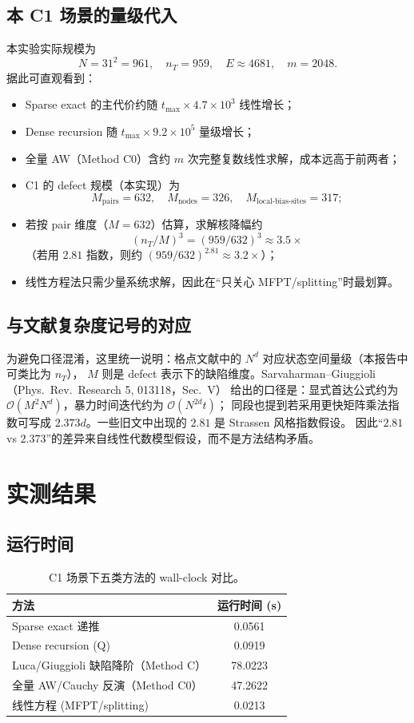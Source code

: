 \documentclass[11pt,a4paper]{ctexart}
\begin{document}
\subsection{本 C1 场景的量级代入}
本实验实际规模为
\[
N=31^2=961,\quad n_T=959,\quad E\approx 4681,\quad m=2048.
\]
据此可直观看到：
\begin{itemize}[leftmargin=2em]
  \item Sparse exact 的主代价约随 $t_{\max}\times 4.7\times 10^3$ 线性增长；
  \item Dense recursion 随 $t_{\max}\times 9.2\times 10^5$ 量级增长；
  \item 全量 AW（Method C0）含约 $m$ 次完整复数线性求解，成本远高于前两者；
  \item C1 的 defect 规模（本实现）为
  \[
  M_{\text{pairs}}=632,\quad M_{\text{nodes}}=326,\quad M_{\text{local-bias-sites}}=317;
  \]
  \item 若按 pair 维度（$M=632$）估算，求解核降幅约
  \[
  (n_T/M)^3=(959/632)^3\approx 3.5\times
  \]
  （若用 $2.81$ 指数，则约 $(959/632)^{2.81}\approx 3.2\times$）；
  \item 线性方程法只需少量系统求解，因此在“只关心 MFPT/splitting”时最划算。
\end{itemize}

\subsection{与文献复杂度记号的对应}
为避免口径混淆，这里统一说明：格点文献中的 $N^d$ 对应状态空间量级（本报告中可类比为 $n_T$），
$M$ 则是 defect 表示下的缺陷维度。Sarvaharman--Giuggioli（Phys.\ Rev.\ Research 5, 013118，Sec.\ V）
给出的口径是：显式首达公式约为 $\mathcal O(M^2N^d)$，暴力时间迭代约为 $\mathcal O(N^{2d}t)$；
同段也提到若采用更快矩阵乘法指数可写成 $2.373d$。一些旧文中出现的 $2.81$ 是 Strassen 风格指数假设。
因此“$2.81$ vs $2.373$”的差异来自线性代数模型假设，而不是方法结构矛盾。

\section{实测结果}
\subsection{运行时间}
\begin{table}[H]
  \centering
  \begin{tabular}{lc}
    \toprule
    方法 & 运行时间 (s) \\
    \midrule
    Sparse exact 递推 & 0.0561 \\
    Dense recursion (Q) & 0.0919 \\
    Luca/Giuggioli 缺陷降阶（Method C） & 78.0223 \\
    全量 AW/Cauchy 反演（Method C0） & 47.2622 \\
    线性方程 (MFPT/splitting) & 0.0213 \\
    \bottomrule
  \end{tabular}
  \caption{C1 场景下五类方法的 wall-clock 对比。}
\end{table}
\end{document}
